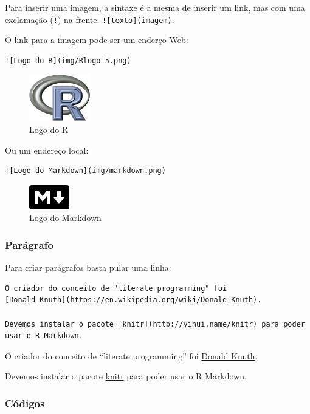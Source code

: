 \documentclass[10pt,a4paper]{book}
\begin{document}
Para inserir uma imagem, a sintaxe é a mesma de inserir um link, mas com
uma exclamação (\texttt{!}) na frente: \texttt{!{[}texto{]}(imagem)}.

O link para a imagem pode ser um enderço Web:

\begin{verbatim}
![Logo do R](img/Rlogo-5.png)
\end{verbatim}

\begin{figure}
\centering
\includegraphics{img/Rlogo-5.png}
\caption{Logo do R}
\end{figure}

Ou um endereço local:

\begin{verbatim}
![Logo do Markdown](img/markdown.png)
\end{verbatim}

\begin{figure}
\centering
\includegraphics{img/markdown.png}
\caption{Logo do Markdown}
\end{figure}

\subsubsection*{Parágrafo}\label{paruxe1grafo}


Para criar parágrafos basta pular uma linha:

\begin{verbatim}
O criador do conceito de "literate programming" foi
[Donald Knuth](https://en.wikipedia.org/wiki/Donald_Knuth).

Devemos instalar o pacote [knitr](http://yihui.name/knitr) para poder
usar o R Markdown.
\end{verbatim}

O criador do conceito de ``literate programming'' foi
\href{https://en.wikipedia.org/wiki/Donald_Knuth}{Donald Knuth}.

Devemos instalar o pacote \href{http://yihui.name/knitr}{knitr} para
poder usar o R Markdown.

\subsubsection*{Códigos}\label{cuxf3digos}
\end{document}
